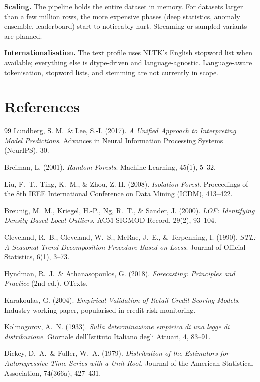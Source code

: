 \documentclass[11pt,a4paper]{article}
\begin{document}
\textbf{Scaling.} The pipeline holds the entire dataset in memory. For
datasets larger than a few million rows, the more expensive phases
(deep statistics, anomaly ensemble, leaderboard) start to noticeably hurt.
Streaming or sampled variants are planned.

\textbf{Internationalisation.} The text profile uses NLTK's English stopword
list when available; everything else is dtype-driven and language-agnostic.
Language-aware tokenisation, stopword lists, and stemming are not currently
in scope.


\section*{References}

\begin{thebibliography}{99}
Lundberg, S. M.\ \& Lee, S.-I. (2017).
\emph{A Unified Approach to Interpreting Model Predictions}.
Advances in Neural Information Processing Systems (NeurIPS), 30.

Breiman, L. (2001).
\emph{Random Forests}.
Machine Learning, 45(1), 5--32.

Liu, F.~T., Ting, K.~M., \& Zhou, Z.-H. (2008).
\emph{Isolation Forest}.
Proceedings of the 8th IEEE International Conference on Data Mining (ICDM), 413--422.

Breunig, M.~M., Kriegel, H.-P., Ng, R.~T., \& Sander, J. (2000).
\emph{LOF: Identifying Density-Based Local Outliers}.
ACM SIGMOD Record, 29(2), 93--104.

Cleveland, R.~B., Cleveland, W.~S., McRae, J.~E., \& Terpenning, I. (1990).
\emph{STL: A Seasonal-Trend Decomposition Procedure Based on Loess}.
Journal of Official Statistics, 6(1), 3--73.

Hyndman, R.~J.\ \& Athanasopoulos, G. (2018).
\emph{Forecasting: Principles and Practice} (2nd ed.).
OTexts.

Karakoulas, G. (2004).
\emph{Empirical Validation of Retail Credit-Scoring Models}.
Industry working paper, popularised in credit-risk monitoring.

Kolmogorov, A.~N. (1933).
\emph{Sulla determinazione empirica di una legge di distribuzione}.
Giornale dell'Istituto Italiano degli Attuari, 4, 83--91.

Dickey, D.~A.\ \& Fuller, W.~A. (1979).
\emph{Distribution of the Estimators for Autoregressive Time Series with a Unit Root}.
Journal of the American Statistical Association, 74(366a), 427--431.


\end{thebibliography}
\end{document}
